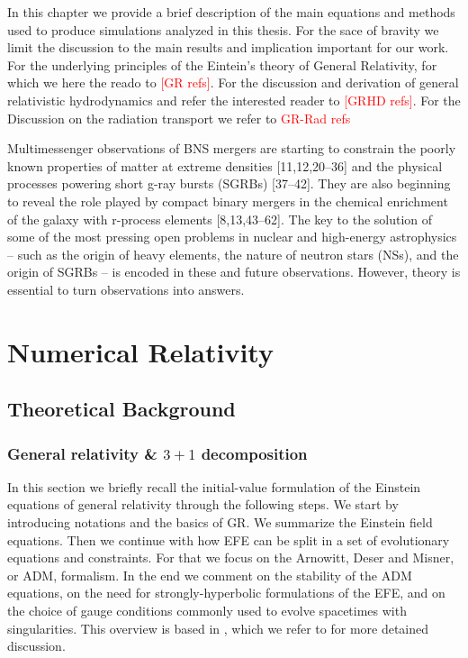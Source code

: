 \documentclass[11pt,a4paper,headinclude=true,DIV=14,BCOR=8mm,chapterprefix,listof=totoc,twoside,openright,abstracton]{scrbook}
\newcommand{\red}[1]{\textcolor{red}{#1}}
\begin{document}
In this chapter we provide a brief description of the main equations and methods used to produce simulations analyzed in this thesis. 
For the sace of bravity we limit the discussion to the main results and implication important for our work.
For the underlying principles of the Eintein's theory of General Relativity, for which we here the reado to \red{[GR refs]}.
For the discussion and derivation of general relativistic hydrodynamics and refer the interested reader to \red{[GRHD refs]}.
For the Discussion on the radiation transport we refer to \red{GR-Rad refs}

Multimessenger observations of BNS mergers are starting to constrain the poorly known properties of
matter at extreme densities [11,12,20–36] and the physical processes powering short g-ray bursts (SGRBs)
[37–42]. They are also beginning to reveal the role played by compact binary mergers in the chemical
enrichment of the galaxy with r-process elements [8,13,43–62]. The key to the solution of some of the most
pressing open problems in nuclear and high-energy astrophysics – such as the origin of heavy elements,
the nature of neutron stars (NSs), and the origin of SGRBs – is encoded in these and future observations.
However, theory is essential to turn observations into answers.

\chapter{Numerical Relativity}

\section{Theoretical Background}

\subsection{General relativity \& $3+1$ decomposition}

In this section we briefly recall the initial-value formulation of the Einstein equations of general relativity through the following steps. We start by introducing notations and the basics of GR. We summarize the Einstein field equations. Then we continue with how EFE can be split in a set of evolutionary equations and constraints. For that we focus on the Arnowitt, Deser and Misner, or ADM, formalism. In the end we comment on the stability of the ADM equations, on the need for strongly-hyperbolic formulations of the EFE, and on the choice of gauge conditions commonly used to
evolve spacetimes with singularities. This overview is based in \cite{Arnowitt:1962hi,Landau:1982dva,Wald:1984,Misner:1973,Baumgarte:2002jm}, which we refer to for more detained discussion.
\end{document}
